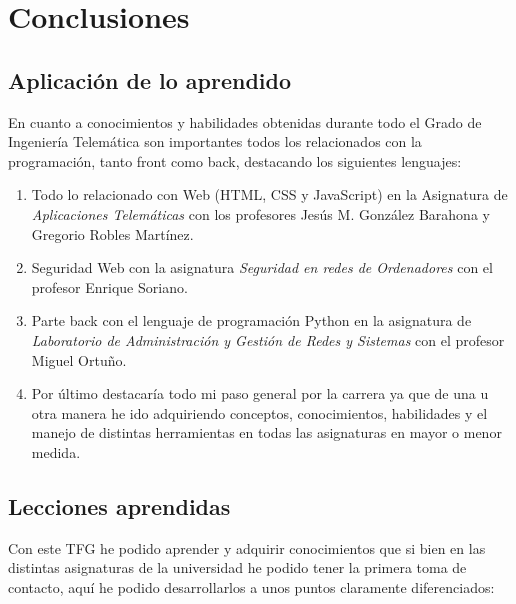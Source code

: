 \documentclass[a4paper, 12pt]{book}
\begin{document}

\cleardoublepage
\chapter{Conclusiones}
\label{chap:conclusiones}

\section{Aplicación de lo aprendido}
\label{sec:aplicacion}

En cuanto a conocimientos y habilidades obtenidas durante todo el Grado de Ingeniería Telemática son importantes todos los relacionados con la programación, tanto front como back, destacando los siguientes lenguajes:

\begin{enumerate}
  \item Todo lo relacionado con Web (HTML, CSS y JavaScript) en la Asignatura de \textit{Aplicaciones Telemáticas} con los profesores Jesús M. González Barahona y Gregorio Robles Martínez.
  \item Seguridad Web con la asignatura \textit{Seguridad en redes de Ordenadores} con el profesor Enrique Soriano.
  \item Parte back con el lenguaje de programación Python en la asignatura de \textit{Laboratorio de Administración y Gestión de Redes y Sistemas} con el profesor Miguel Ortuño.
  \item Por último destacaría todo mi paso general por la carrera ya que de una u otra manera he ido adquiriendo conceptos, conocimientos, habilidades y el manejo de distintas herramientas en todas las asignaturas en mayor o menor medida.
\end{enumerate}


\section{Lecciones aprendidas}
\label{sec:lecciones_aprendidas}

Con este TFG he podido aprender y adquirir conocimientos que si bien en las distintas asignaturas de la universidad he podido tener la primera toma de contacto, aquí he podido desarrollarlos a unos puntos claramente diferenciados:
\end{document}
